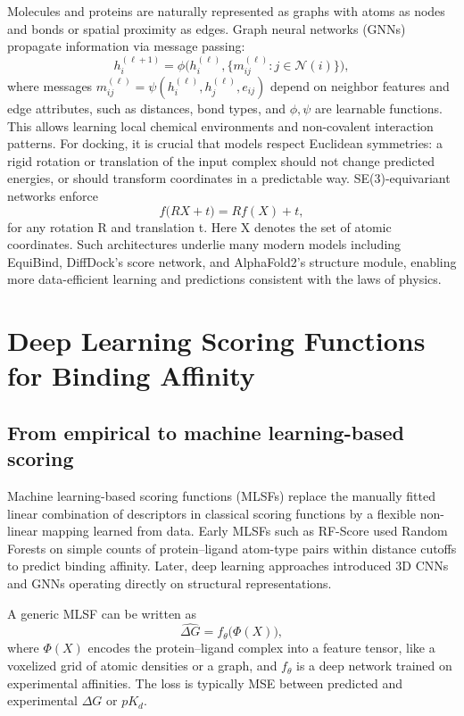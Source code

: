 \documentclass[12pt]{article}
\begin{document}
Molecules and proteins are naturally represented as graphs with atoms as nodes and bonds or spatial proximity as edges. Graph neural networks (GNNs) propagate information via message passing:
\[
h_i^{(\ell+1)} = \phi\big(h_i^{(\ell)}, \big\{ m_{ij}^{(\ell)} : j \in \mathcal{N}(i) \big\}\big),
\]
where messages $m_{ij}^{(\ell)} = \psi(h_i^{(\ell)}, h_j^{(\ell)}, e_{ij})$ depend on neighbor features and edge attributes, such as  distances, bond types, and $\phi,\psi$ are learnable functions. This allows learning local chemical environments and non-covalent interaction patterns. For docking, it is crucial that models respect Euclidean symmetries: a rigid rotation or translation of the input complex should not change predicted energies, or should transform coordinates in a predictable way. SE(3)-equivariant networks enforce
\[
f\big(R X + t\big) = R f(X) + t,
\]
for any rotation R and translation t. Here X denotes the set of atomic coordinates. Such architectures underlie many modern models including EquiBind, DiffDock’s score network, and AlphaFold2’s structure module, enabling more data-efficient learning and predictions consistent with the laws of physics.\cite{CH13_stark2022equibind,CH13_jumper2021alphafold,CH13_corso2022diffdock}

\section{Deep Learning Scoring Functions for Binding Affinity}

\subsection{From empirical to machine learning-based scoring}

Machine learning-based scoring functions (MLSFs) replace the manually fitted linear combination of descriptors in classical scoring functions by a flexible non-linear mapping learned from data.\cite{CH13_meli2022dlreview} Early MLSFs such as RF-Score used Random Forests on simple counts of protein–ligand atom-type pairs within distance cutoffs to predict binding affinity.\cite{CH13_meli2022dlreview,CH13_durant2025robustly} Later, deep learning approaches introduced 3D CNNs and GNNs operating directly on structural representations.

A generic MLSF can be written as
\[
\hat{\Delta G} = f_{\theta}\big( \Phi(X) \big),
\]
where $\Phi(X)$ encodes the protein–ligand complex into a feature tensor, like a voxelized grid of atomic densities or a graph, and $f_{\theta}$ is a deep network trained on experimental affinities. The loss is  typically MSE between predicted and experimental $\Delta G$ or $pK_d$.
\end{document}
